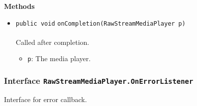 \textbf{\sffamily Methods}
\begin{itemize}
\item \lstinline|public void| \lstinline|onCompletion|\lstinline|(RawStreamMediaPlayer p)|\\ \\[-0.6em]
Called after completion.
\begin{itemize}
\item \lstinline|p|: The media player.
\end{itemize}



\end{itemize}

\subsubsection{Interface \lstinline|RawStreamMediaPlayer.OnErrorListener|}
Interface for error callback. \\
\noindent\begin{minipage}[t]{5cm}
\vspace{0.3em}
\hspace*{2em}
\vspace{0.3em}
\end{minipage}





